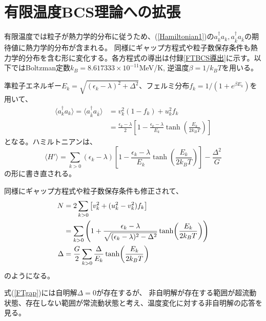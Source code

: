 \documentclass[a4paper]{jsreport}
\begin{document}
  \section{有限温度BCS理論への拡張}
  有限温度では粒子が熱力学的分布に従うため、(\ref{Hamiltonian1})の\(a^{\dagger}_ka_k,a^{\dagger}_{\bar{k}}a_{\bar{k}}\)の期待値に熱力学的分布が含まれる。
  同様にギャップ方程式や粒子数保存条件も熱力学的分布を含む形に変化する。各方程式の導出は付録\ref{FTBCS導出}に示す。以下ではBoltzman定数\(k_B=8.617333\times 10^{-11}\)MeV/K,
  逆温度\(\beta=1/k_B T\)を用いる。
  
  準粒子エネルギー\(E_k=\sqrt{(\epsilon_k-\lambda)^2+\Delta^2}\)、フェルミ分布\(f_k=1/(1+e^{\beta E_k})\)を用いて、
  \begin{align}
    \langle a^{\dagger}_ka_k \rangle =\langle a^{\dagger}_{\bar{k}}a_{\bar{k}}\rangle&=
    v_k^2(1-f_k)+u_k^2f_k\\
    &=\frac{\epsilon_k - \lambda}{2}\left[1-\frac{\epsilon_k-\lambda}{E_k}\tanh(\frac{E_k}{2k_B T})\right]
  \end{align}
  となる。ハミルトニアンは、
  \begin{equation}
    \langle H'\rangle=\sum_{k>0}(\epsilon_k - \lambda)\left[1-\frac{\epsilon_k-\lambda}{E_k}\tanh(\frac{E_k}{2k_B T})\right]-\frac{\Delta^2}{G}
  \end{equation}
  の形に書き直される。
  
  同様にギャップ方程式や粒子数保存条件も修正されて、
  \begin{align}
    N       &= 2\sum_{k>0}\left[v_k^2 + (u_k^2-v_k^2)f_k\right] \notag\\
            &= \sum_{k>0}\left(1+\frac{\epsilon_k-\lambda}{\sqrt{(\epsilon_k-\lambda)^2-\Delta^2}}\tanh(\frac{E_k}{2k_BT})\right)\\
    \Delta  &= \frac{G}{2}\sum_{k>0}\frac{\Delta}{E_k}\tanh(\frac{E_k}{2k_BT})\label{FTgap}
  \end{align}
  のようになる。

  式(\ref{FTgap})には自明解\(\Delta=0\)が存在するが、
  非自明解が存在する範囲が超流動状態、存在しない範囲が常流動状態と考え、温度変化に対する非自明解の応答を見る。
\end{document}
